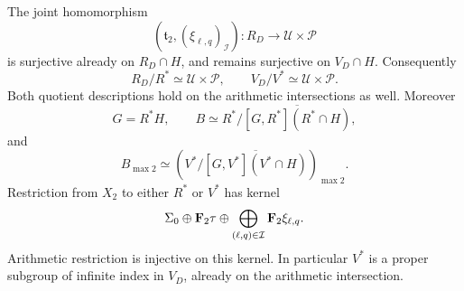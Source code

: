 \begin{theorem}\label{thm:simultaneous-quadratic-normalization}
The joint homomorphism
\[
 (\mathfrak t_2,(\xi_{\ell,q})_{\mathcal I})
                      :R_D\longrightarrow\mathcal U\times\mathcal P
\]
is surjective already on \(R_D\cap H\), and remains surjective
on \(V_D\cap H\). Consequently
\[
 R_D/R^*\simeq\mathcal U\times\mathcal P,
 \qquad V_D/V^*\simeq\mathcal U\times\mathcal P.
\]
Both quotient descriptions hold on the arithmetic intersections as
well. Moreover
\[
 G=R^*H,\qquad
 B\simeq R^*/\overline{[G,R^*](R^*\cap H)},
\]
and
\[
 B_{\max2}\simeq
 \left(V^*/\overline{[G,V^*](V^*\cap H)}\right)_{\max2}.
\]
Restriction from \(X_2\) to either \(R^*\) or \(V^*\) has kernel
\[
 \Sigma_0\oplus\mathbf F_2\tau\oplus
                 \bigoplus_{(\ell,q)\in\mathcal I}\mathbf F_2\xi_{\ell,q}.
\]
Arithmetic restriction is injective on this kernel. In particular
\(V^*\) is a proper subgroup of infinite index in \(V_D\),
already on the arithmetic intersection.
\end{theorem}
